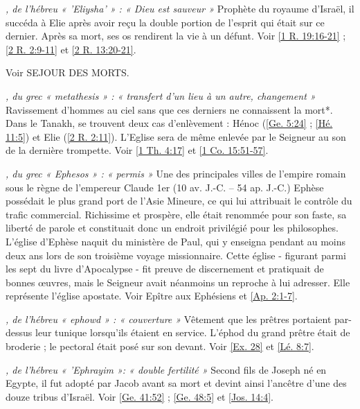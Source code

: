 \begin{multicols}{2}
\textit{, de l'hébreu « 'Eliysha' » : « Dieu est sauveur »}\newline
Prophète du royaume d'Israël, il succéda à Elie après avoir reçu la double portion de l'esprit qui était sur ce dernier. Après sa mort, ses os rendirent la vie à un défunt. Voir \vref{1 R. 19:16-21} ; \vref{2 R. 2:9-11} et \vref{2 R. 13:20-21}.

\textit{}\newline
Voir SEJOUR DES MORTS.

\textit{, du grec « metathesis » : « transfert d'un lieu à un autre, changement »}\newline
Ravissement d'hommes au ciel sans que ces derniers ne connaissent la mort*. Dans le Tanakh, se trouvent deux cas d'enlèvement : Hénoc (\vref{Ge. 5:24} ; \vref{Hé. 11:5}) et Elie (\vref{2 R. 2:11}). L'Eglise sera de même enlevée par le Seigneur au son de la dernière trompette. Voir \vref{1 Th. 4:17} et \vref{1 Co. 15:51-57}.

\textit{, du grec « Ephesos » : « permis »}\newline
Une des principales villes de l'empire romain sous le règne de l'empereur Claude 1er (10 av. J.-C. – 54 ap. J.-C.) Ephèse possédait le plus grand port de l'Asie Mineure, ce qui lui attribuait le contrôle du trafic commercial. Richissime et prospère, elle était renommée pour son faste, sa liberté de parole et constituait donc un endroit privilégié pour les philosophes. L'église d'Ephèse naquit du ministère de Paul, qui y enseigna pendant au moins deux ans lors de son troisième voyage missionnaire. Cette église - figurant parmi les sept du livre d'Apocalypse - fit preuve de discernement et pratiquait de bonnes œuvres, mais le Seigneur avait néanmoins un reproche à lui adresser. Elle représente l'église apostate. Voir Epître aux Ephésiens et \vref{Ap. 2:1-7}.

\textit{, de l'hébreu « ephowd » : « couverture »}\newline
Vêtement que les prêtres portaient par-dessus leur tunique lorsqu'ils étaient en service. L'éphod du grand prêtre était de broderie ; le pectoral était posé sur son devant. Voir \vref{Ex. 28} et \vref{Lé. 8:7}.

\textit{, de l'hébreu « 'Ephrayim »: « double fertilité »}\newline
Second fils de Joseph né en Egypte, il fut adopté par Jacob avant sa mort et devint ainsi l'ancêtre d'une des douze tribus d'Israël. Voir \vref{Ge. 41:52} ; \vref{Ge. 48:5} et \vref{Jos. 14:4}.


\end{multicols}

